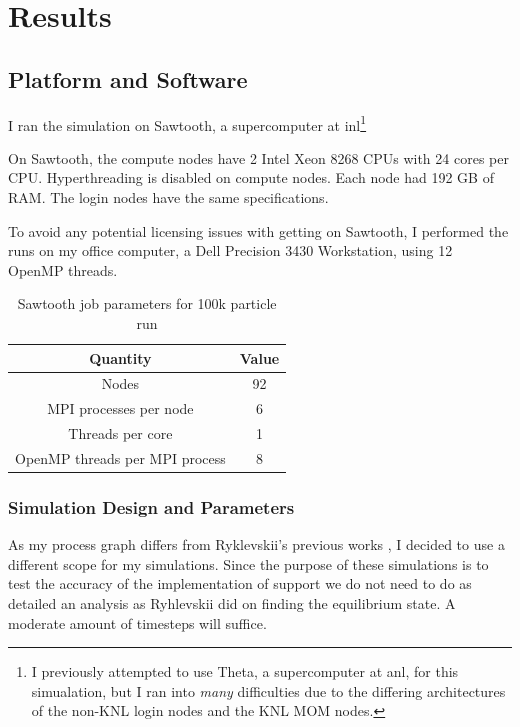 \chapter{Results}
\label{ch:chapter5}

\section{Platform and Software}
\label{sub:platform-software}
I ran the \OpenMC simulation on Sawtooth, a supercomputer at
\Gls{inl}\footnote{I previously attempted to use Theta, a supercomputer at
\Gls{anl}, for this simualation, but I ran into {\it many} difficulties due to
the differing architectures of the non-KNL login nodes and the KNL MOM nodes.}

On Sawtooth, the compute nodes have 2 Intel Xeon 8268 CPUs with 24 cores per
CPU. Hyperthreading is disabled on compute nodes. Each node had 192 GB of RAM.
The login nodes have the same specifications.

To avoid any potential licensing issues with getting \SerpentTWO on Sawtooth,
I performed the \SerpentTWO runs on my office computer, a Dell Precision 3430
Workstation, using 12 OpenMP threads.

\begin{table}[htpb] 
    \centering 
    \caption{Sawtooth job parameters for 100k particle \OpenMC run}
    \label{tab:sawtooth-params}
    \begin{tabular}{|c|c|} 
        \hline
        Quantity & Value\\
        \hline
        Nodes & 92 \\
        \hline
        MPI processes per node & 6 \\
        \hline
        Threads per core & 1 \\
        \hline
        OpenMP threads per MPI process & 8 \\
        \hline
    \end{tabular}
\end{table}

\subsection{Simulation Design and Parameters}
\label{sub:simulation-parameters}

As my process graph differs from Ryklevskii's previous works
\cite{rykhlevskii_fuel_2020}, I decided to use a different scope for my
simulations. Since the purpose of these simulations is to test the accuracy of
the implementation of \OpenMC support we do not need to do as detailed an
analysis as Ryhlevskii did on finding the equilibrium state. A moderate amount
of timesteps will suffice.


